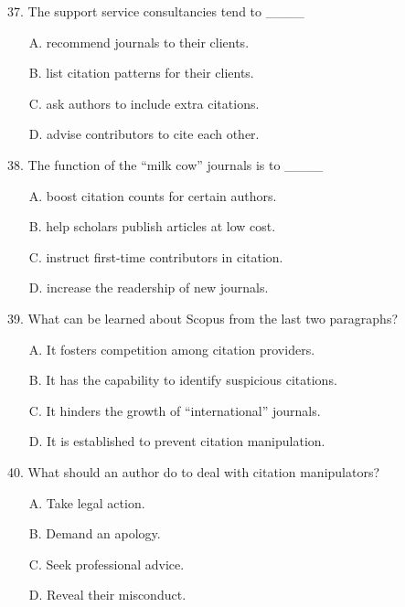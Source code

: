 \documentclass[UTF8,11pt]{ctexart}
\begin{document}
37. The support service consultancies tend to \_\_\_\_


\begin{itemize}[leftmargin=2em,itemsep=.2em,topsep=.4em]\item[A.] recommend journals to their clients.
\item[B.] list citation patterns for their clients.
\item[C.] ask authors to include extra citations.
\item[D.] advise contributors to cite each other.
\end{itemize}

38. The function of the “milk cow” journals is to \_\_\_\_


\begin{itemize}[leftmargin=2em,itemsep=.2em,topsep=.4em]\item[A.] boost citation counts for certain authors.
\item[B.] help scholars publish articles at low cost.
\item[C.] instruct first-time contributors in citation.
\item[D.] increase the readership of new journals.
\end{itemize}

39. What can be learned about Scopus from the last two paragraphs?


\begin{itemize}[leftmargin=2em,itemsep=.2em,topsep=.4em]\item[A.] It fosters competition among citation providers.
\item[B.] It has the capability to identify suspicious citations.
\item[C.] It hinders the growth of “international” journals.
\item[D.] It is established to prevent citation manipulation.
\end{itemize}

40. What should an author do to deal with citation manipulators?


\begin{itemize}[leftmargin=2em,itemsep=.2em,topsep=.4em]\item[A.] Take legal action.
\item[B.] Demand an apology.
\item[C.] Seek professional advice.
\item[D.] Reveal their misconduct.
\end{itemize}
\end{document}

